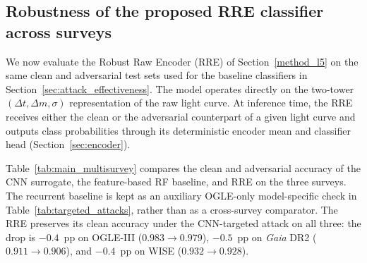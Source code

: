 \documentclass{aa}
\begin{document}
\subsection{Robustness of the proposed RRE classifier across surveys}
\label{sec:l5_robustness}


We now evaluate the Robust Raw Encoder (RRE) of Section~\ref{method_l5}
on the same clean and adversarial test sets used for the baseline
classifiers in Section~\ref{sec:attack_effectiveness}. The model operates
directly on the two-tower $(\Delta t, \Delta m, \sigma)$ representation of
the raw light curve. At inference time, the RRE receives either the clean
or the adversarial counterpart of a given light curve and outputs class
probabilities through its deterministic encoder mean and classifier head
(Section~\ref{sec:encoder}).

Table~\ref{tab:main_multisurvey} compares the clean and adversarial
accuracy of the CNN surrogate, the feature-based RF baseline, and RRE
on the three surveys. The recurrent baseline is kept as an auxiliary
OGLE-only model-specific check in Table~\ref{tab:targeted_attacks}, rather
than as a cross-survey comparator. The RRE preserves its clean accuracy
under the CNN-targeted
attack on all three: the drop is $-0.4$~pp on OGLE-III ($0.983 \to 0.979$),
$-0.5$~pp on \textit{Gaia} DR2 ($0.911 \to 0.906$), and $-0.4$~pp on WISE
($0.932 \to 0.928$).
\end{document}

